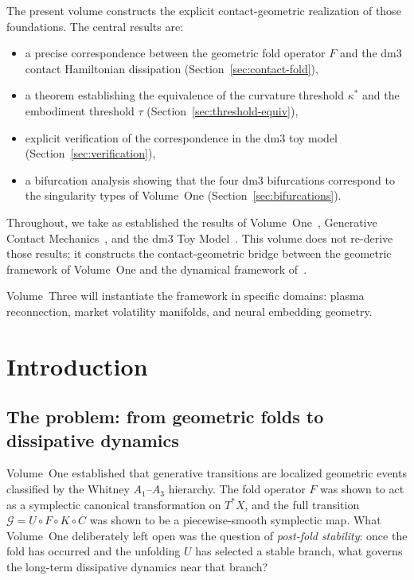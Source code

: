 \documentclass[12pt]{article}
\numberwithin{equation}{section}
\theoremstyle{remark}
\newcommand{\cG}{\mathcal{G}}
\begin{document}
The present volume constructs the explicit contact-geometric
realization of those foundations. The central results are:
\begin{itemize}[leftmargin=*]
  \item a precise correspondence between the geometric fold operator
        $F$ and the dm3 contact Hamiltonian dissipation
        (Section~\ref{sec:contact-fold}),
  \item a theorem establishing the equivalence of the curvature
        threshold $\kappa^*$ and the embodiment threshold $\tau$
        (Section~\ref{sec:threshold-equiv}),
  \item explicit verification of the correspondence in the dm3 toy
        model (Section~\ref{sec:verification}),
  \item a bifurcation analysis showing that the four dm3 bifurcations
        correspond to the singularity types of Volume~One
        (Section~\ref{sec:bifurcations}).
\end{itemize}

Throughout, we take as established the results of
Volume~One~\cite{PO1}, Generative Contact Mechanics~\cite{Paper1},
and the dm3 Toy Model~\cite{Paper2}. This volume does not re-derive
those results; it constructs the contact-geometric bridge between
the geometric framework of Volume~One and the dynamical framework
of~\cite{Paper1,Paper2}.

Volume~Three will instantiate the framework in specific domains:
plasma reconnection, market volatility manifolds, and neural
embedding geometry.

\section{Introduction}
\label{sec:intro}

\subsection{The problem: from geometric folds to dissipative dynamics}

Volume~One established that generative transitions are localized
geometric events classified by the Whitney $A_1$--$A_3$ hierarchy.
The fold operator $F$ was shown to act as a symplectic canonical
transformation on $T^*X$, and the full transition
$\cG = U\circ F\circ K\circ C$ was shown to be a piecewise-smooth
symplectic map. What Volume~One deliberately left open was the
question of \emph{post-fold stability}: once the fold has occurred
and the unfolding $U$ has selected a stable branch, what governs
the long-term dissipative dynamics near that branch?
\end{document}
